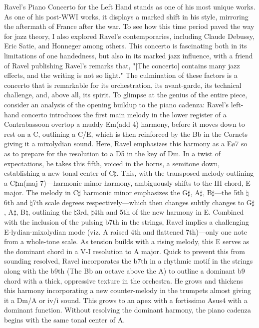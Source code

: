 \documentclass[12pt]{article}
\begin{document}
Ravel’s Piano Concerto for the Left Hand stands as one of his most unique works. As one of his post-WWI works, it displays a marked shift in his style, mirroring the aftermath of France after the war.\autocite[100]{Orenstein} 
To see how this time period paved the way for jazz theory, I also explored Ravel's contemporaries, including Claude Debussy, Eric Satie, and Honneger among others. 
This concerto is fascinating both in its limitations of one handedness, but also in its marked jazz influence, with a friend of Ravel publishing Ravel's remarks that, "[The concerto] contains many jazz effects, and the writing is not so light."\autocite{1933} The culmination of these factors is a concerto that is remarkable for its orchestration, its avant-garde, its technical challenge, and, above all, its spirit.
 To glimpse at the genius of the entire piece, consider an analysis of the opening buildup to the piano cadenza: Ravel’s left-hand concerto introduces the first main melody in the lower register of a Contrabassoon overtop a muddy Em(add 4) harmony, before it moves down to rest on a C, outlining a C/E, which is then reinforced by the Bb in the Cornets giving it a mixolydian sound. Here, Ravel emphasizes this harmony as a Eø7 so as to prepare for the resolution to a D5 in the key of Dm. In a twist of expectations, he takes this fifth, voiced in the horns, a semitone down, establishing a new tonal center of C$\sharp$. This, with the transposed melody outlining a C$\sharp$m(maj 7)—harmonic minor harmony, ambiguously shifts to the III chord, E major. The melody in C$\sharp$ harmonic minor emphasizes the G$\sharp$, A$\sharp$, B$\sharp$—the 5th $\natural$6th and $\natural$7th scale degrees respectively—which then changes subtly changes to G$\sharp$, A$\sharp$, B$\natural$, outlining the $\natural$3rd, $\sharp$4th and 5th of the new harmony in E. Combined with the inclusion of the pulsing b7th in the strings, Ravel implies a challenging E-lydian-mixolydian mode (viz. A raised 4th and flattened 7th)—only one note from a whole-tone scale. As tension builds with a rising melody, this E serves as the dominant chord in a V-I resolution to A major. Quick to prevent this from sounding resolved, Ravel incorporates the b7th in a rhythmic motif in the strings along with the b9th (The Bb an octave above the A) to outline a dominant b9 chord with a thick, oppressive texture in the orchestra. He grows and thickens this harmony incorporating a new counter-melody in the trumpets almost giving it a Dm/A or iv/i sound. This grows to an apex with a fortissimo Asus4 with a dominant function. Without resolving the dominant harmony, the piano cadenza begins with the same tonal center of A.\autocite{ravel}
\end{document}
